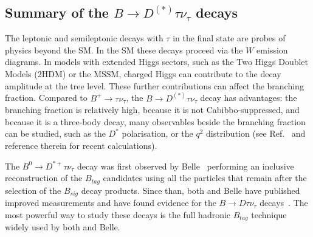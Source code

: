 \subsection{Summary of the $B\to D^{(*)}\tau \nu_\tau$ decays}
\label{slbdecays_b2dtaunu}

The leptonic and semileptonic decays with $\tau$ in the final state 
are probes of physics beyond the SM. In the SM these decays proceed via the $W$ emission
diagrams. In models with extended Higgs sectors, such as the Two Higgs Doublet Models (2HDM)
or the MSSM, charged Higgs can contribute to the decay amplitude at the tree level. These further contributions
can affect the branching fraction. Compared to $B^+\to\tau\nu_\tau$, the $B\to D^{(*)}\tau \nu_\tau$ decay
has advantages: the branching fraction is relatively high, because it is not Cabibbo-suppressed, and because
it is a three-body decay, many observables beside the branching fraction can be studied, such as the $D^*$
polarisation, or the $q^2$ distribution (see Ref.~\cite{Duraisamy:2014sna} and reference therein for recent 
calculations).

The $B^0\to D^{*+}\tau\nu_\tau$ decay was first observed by Belle~\cite{Matyja:2007kt} performing 
an inclusive reconstruction of the $B_{tag}$ candidates using all the particles that remain after the selection
of the $B_{sig}$ decay products. Since than, both \babar and Belle have published improved measurements 
and have found evidence for the $B\to D\tau\nu_\tau$ decays~\cite{Aubert:2007dsa,Adachi:2009qg,Bozek:2010xy}. 
The most powerful way to study these decays is the full hadronic $B_{tag}$ technique widely used by both \babar and Belle.

